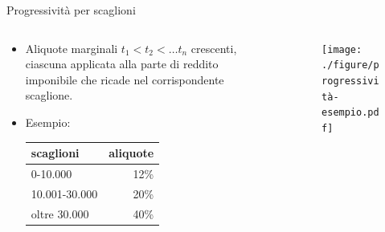 \documentclass[aspectratio=64,12pt]{beamer}
\newcommand\€{\,\text{€}}
\begin{document}
\begin{frame}{Progressività per scaglioni}
\begin{columns}
\begin{column}{.4\columnwidth}
\small
\begin{itemize}
\item Aliquote marginali $t_1<t_2<\dots t_n$ crescenti, ciascuna applicata alla
parte di reddito imponibile che ricade nel corrispondente scaglione.
\item Esempio:
  \begin{tabular}{lr}
\toprule scaglioni & aliquote \\ \midrule 
0-10.000 & 12\% \\ 
  10.001-30.000 & 20\% \\ 
  oltre 30.000 & 40\% \\
  \bottomrule
\end{tabular}
\end{itemize}
\end{column}

\begin{column}{.6\columnwidth}
\begin{figure}
\centering
\texttt{[image: ./figure/progressività-esempio.pdf]}
\end{figure}
\end{column}
\end{columns}
\end{frame}
\end{document}
